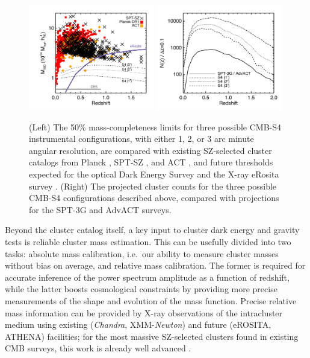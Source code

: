 \begin{figure}[t]
\begin{center}
\includegraphics[width=0.49\textwidth]{DarkEnergy/mass_vs_z_s4.pdf}
\includegraphics[width=0.49\textwidth]{DarkEnergy/dndz_s4.pdf}
\caption{(Left) The 50\% mass-completeness limits for three possible CMB-S4 instrumental configurations, with either 1, 2, or 3 arc minute angular resolution, are compared with existing SZ-selected cluster catalogs from Planck \cite{Ade:2015mva}, SPT-SZ \cite{Bleem:2014iim}, and ACT \cite{Hasselfield:2013wf}, and future thresholds expected for the optical Dark Energy Survey and the X-ray eRosita survey \cite{Pillepich:2011zz}.  (Right) The projected cluster counts for the three possible CMB-S4 configurations described above, compared with projections for the SPT-3G \cite{Benson:2014qhw} and AdvACT surveys.}
\label{fig:cluster_counts}
\end{center}
\end{figure} 

Beyond the cluster catalog itself, a key input to cluster dark energy and gravity tests is reliable cluster mass estimation. This can be usefully divided into two tasks: absolute mass calibration, i.e.\ our ability to measure cluster masses without bias on average, and relative mass calibration. The former is required for accurate inference of the power spectrum amplitude as a function of redshift, while the latter boosts cosmological constraints by providing more precise measurements of the shape and evolution of the mass function.  Precise relative mass information can be provided by X-ray observations of the intracluster medium using existing ({\it Chandra}, XMM-{\it Newton}) and future (eROSITA, ATHENA) facilities; for the most massive SZ-selected clusters found in existing CMB surveys, this work is already well advanced \cite{deHaan:2016qvy, Andersson:2010vy}. 

